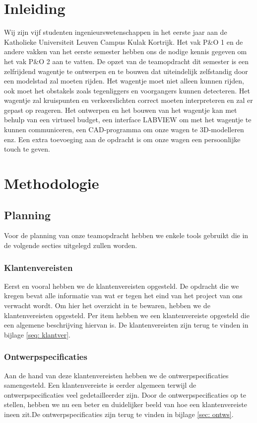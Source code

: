 \documentclass[a4paper,twoside,kulak]{kulakreport}
\begin{document}
	
	\chapter*{Inleiding}

Wij zijn vijf studenten ingenieurswetenschappen in het eerste jaar aan de Katholieke Universiteit Leuven Campus Kulak Kortrijk.
Het vak P\&O 1 en de andere vakken van het eerste semester hebben ons de nodige kennis gegeven om het vak P\&O 2 aan te vatten. 
De opzet van de teamopdracht dit semester is een zelfrijdend wagentje te ontwerpen en te bouwen dat uiteindelijk zelfstandig door een modelstad zal moeten rijden. Het wagentje moet niet alleen kunnen rijden, ook moet het obstakels zoals tegenliggers en voorgangers kunnen detecteren. Het wagentje zal kruispunten en verkeerslichten correct moeten  interpreteren en zal er gepast op reageren. Het ontwerpen en het bouwen van het wagentje kan met behulp van een virtueel budget, een interface LABVIEW om met het wagentje te kunnen communiceren, een CAD-programma om onze wagen te 3D-modelleren enz. 
Een extra toevoeging aan de opdracht is om onze wagen een persoonlijke touch te geven. 
	
	\chapter{Methodologie}
	
	
	
	\section{Planning}
	
	Voor de planning van onze teamopdracht hebben we enkele tools gebruikt die in de volgende secties uitgelegd zullen worden. 
	\subsection*{Klantenvereisten}
	Eerst en vooral hebben we de klantenvereisten opgesteld. De opdracht die we kregen bevat alle informatie van wat er tegen het eind van het project van ons verwacht wordt. Om hier het overzicht in te bewaren, hebben we de klantenvereisten opgesteld. Per item hebben we een klantenvereiste opgesteld die een algemene beschrijving hiervan is. De klantenvereisten zijn terug te vinden in bijlage \ref{seq: klantver}. 
	
	\subsection*{Ontwerpspecificaties}Aan de hand van deze klantenvereisten hebben we de ontwerpspecificaties samengesteld. Een klantenvereiste is eerder algemeen terwijl de ontwerpspecificaties veel gedetailleerder zijn. Door de ontwerpspecificaties op te stellen, hebben we nu een beter en duidelijker beeld van hoe een klantenvereiste ineen zit.De ontwerpspecificaties zijn terug te vinden in bijlage \ref{sec: ontws}. 
	
\end{document}
